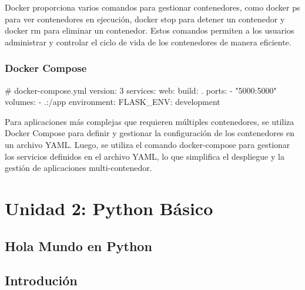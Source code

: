 \documentclass[
  a4paper,
  DIV=11,
  numbers=noendperiod,
  onepage,
  openany]{scrreprt}
\newenvironment{Shaded}{\begin{snugshade}}{\end{snugshade}}
\newcommand{\AttributeTok}[1]{\textcolor[rgb]{0.40,0.45,0.13}{#1}}
\newcommand{\CommentTok}[1]{\textcolor[rgb]{0.37,0.37,0.37}{#1}}
\newcommand{\FunctionTok}[1]{\textcolor[rgb]{0.28,0.35,0.67}{#1}}
\newcommand{\KeywordTok}[1]{\textcolor[rgb]{0.00,0.23,0.31}{#1}}
\newcommand{\StringTok}[1]{\textcolor[rgb]{0.13,0.47,0.30}{#1}}
\begin{document}
Docker proporciona varios comandos para gestionar contenedores, como
docker ps para ver contenedores en ejecución, docker stop para detener
un contenedor y docker rm para eliminar un contenedor. Estos comandos
permiten a los usuarios administrar y controlar el ciclo de vida de los
contenedores de manera eficiente.

\section{Docker Compose 📙}\label{docker-compose-1}

\begin{Shaded}
\begin{Highlighting}[]
\CommentTok{\# docker{-}compose.yml}
\FunctionTok{version}\KeywordTok{:}\AttributeTok{ }\StringTok{\textquotesingle{}3\textquotesingle{}}
\FunctionTok{services}\KeywordTok{:}
\AttributeTok{  }\FunctionTok{web}\KeywordTok{:}
\AttributeTok{    }\FunctionTok{build}\KeywordTok{:}\AttributeTok{ .}
\AttributeTok{    }\FunctionTok{ports}\KeywordTok{:}
\AttributeTok{      }\KeywordTok{{-}}\AttributeTok{ }\StringTok{"5000:5000"}
\AttributeTok{    }\FunctionTok{volumes}\KeywordTok{:}
\AttributeTok{      }\KeywordTok{{-}}\AttributeTok{ .:/app}
\AttributeTok{    }\FunctionTok{environment}\KeywordTok{:}
\AttributeTok{      }\FunctionTok{FLASK\_ENV}\KeywordTok{:}\AttributeTok{ development}
\end{Highlighting}
\end{Shaded}

Para aplicaciones más complejas que requieren múltiples contenedores, se
utiliza Docker Compose para definir y gestionar la configuración de los
contenedores en un archivo YAML. Luego, se utiliza el comando
docker-compose para gestionar los servicios definidos en el archivo
YAML, lo que simplifica el despliegue y la gestión de aplicaciones
multi-contenedor.

\part{Unidad 2: Python Básico}

\chapter{Hola Mundo en Python}\label{hola-mundo-en-python}

\chapter{Introdución 🫥}\label{introduciuxf3n}
\end{document}
